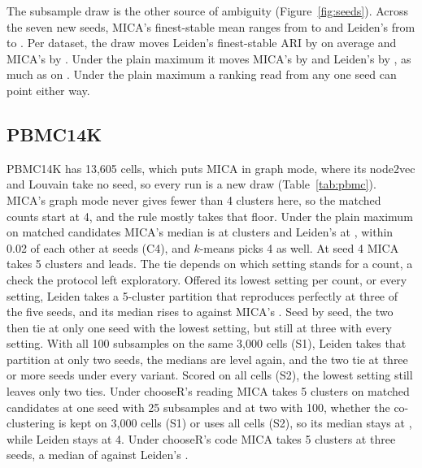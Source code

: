 The subsample draw is the other source of ambiguity (Figure~\ref{fig:seeds}). Across the seven new seeds,
MICA's finest-stable mean ranges from  to  and Leiden's
from  to . Per dataset, the draw moves Leiden's
finest-stable ARI by  on average and MICA's by . Under the plain
maximum it moves MICA's by  and Leiden's by , as much as
 on . Under the plain maximum a ranking read from any one seed
can point either way.



\subsection{PBMC14K}\label{sec:pbmc}
PBMC14K has 13,605 cells, which puts MICA in graph mode, where its node2vec and Louvain take no seed, so every
run is a new draw (Table~\ref{tab:pbmc}). MICA's graph mode never gives fewer than 4 clusters here, so the
matched counts start at 4, and the rule mostly takes that floor. Under the plain maximum on matched
candidates MICA's median is  at  clusters and Leiden's
 at , within 0.02 of each other at  seeds (C4),
and $k$-means picks 4 as well. At seed 4 MICA takes 5 clusters and leads. The tie depends on which
setting stands for a count, a check the protocol left exploratory. Offered its lowest setting per count, or
every setting, Leiden takes a 5-cluster partition that reproduces perfectly at three of the five seeds, and
its median rises to  against MICA's . Seed by seed, the two
then tie at only one seed with the lowest setting, but still at three with every setting. With all 100
subsamples on the same 3,000 cells (S1), Leiden takes that partition at only two seeds, the medians are
level again, and the two tie at three or more seeds under every variant. Scored on all cells (S2), the
lowest setting still leaves only two ties. Under chooseR's reading MICA
takes 5 clusters on matched candidates at one seed with 25 subsamples and at two with 100, whether the
co-clustering is kept on 3,000 cells (S1) or uses all cells (S2), so its median stays at
, while Leiden stays at 4. Under chooseR's code MICA takes 5 clusters at three seeds,
a median of  against Leiden's .

